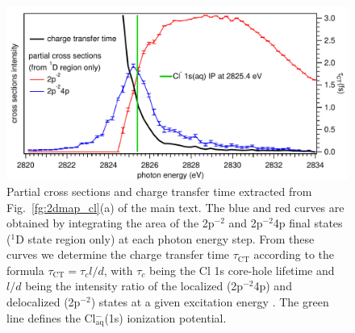 \documentclass[journal=jpclcd,manuscript=letter]{achemso}
\begin{document}
\begin{figure}
\centering
\includegraphics[scale=0.9]{figures/partial_cross_sec_ct_time.pdf}
\caption{Partial cross sections and charge transfer time extracted from Fig.\ \ref{fg:2dmap_cl}(a) of the main text. The blue and red curves are obtained by integrating the area of the 2p$^{-2}$ and 2p$^{-2}$4p final states ($^1$D state region only) at each photon energy step. From these curves we determine the charge transfer time $\tau_{\text{CT}}$ according to the formula $\tau_{\text{CT}} = \tau_{c} l/d$, with $\tau_{c}$ being the Cl 1s core-hole lifetime and $l/d$ being the intensity ratio of the localized (2p$^{-2}$4p) and delocalized (2p$^{-2}$) states at a given excitation energy \cite{foehlisch05:373}.  The green line defines the Cl$^{-}_{\text{aq}}$(1s) ionization potential.}
\label{fg:si_ct_time}
\end{figure}
\end{document}
